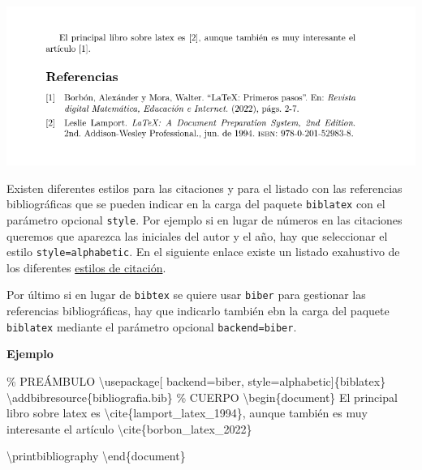 \documentclass[
  a4paper,
]{scrreport}
\newenvironment{Shaded}{\begin{snugshade}}{\end{snugshade}}
\newcommand{\BuiltInTok}[1]{\textcolor[rgb]{0.00,0.23,0.31}{#1}}
\newcommand{\CommentTok}[1]{\textcolor[rgb]{0.37,0.37,0.37}{#1}}
\newcommand{\ExtensionTok}[1]{\textcolor[rgb]{0.00,0.23,0.31}{#1}}
\newcommand{\FunctionTok}[1]{\textcolor[rgb]{0.28,0.35,0.67}{#1}}
\newcommand{\KeywordTok}[1]{\textcolor[rgb]{0.00,0.23,0.31}{#1}}
\newcommand{\NormalTok}[1]{\textcolor[rgb]{0.00,0.23,0.31}{#1}}
\begin{document}
\begin{tcolorbox}[enhanced jigsaw, bottomrule=.15mm, leftrule=.75mm, opacityback=0, titlerule=0mm, bottomtitle=1mm, colbacktitle=quarto-callout-note-color!10!white, arc=.35mm, toprule=.15mm, colframe=quarto-callout-note-color-frame, title={Salida}, coltitle=black, colback=white, breakable, toptitle=1mm, rightrule=.15mm, left=2mm, opacitybacktitle=0.6]

\includegraphics{./img/bibliografia/bibliografia.png}

\end{tcolorbox}

Existen diferentes estilos para las citaciones y para el listado con las
referencias bibliográficas que se pueden indicar en la carga del paquete
\texttt{biblatex} con el parámetro opcional \texttt{style}. Por ejemplo
si en lugar de números en las citaciones queremos que aparezca las
iniciales del autor y el año, hay que seleccionar el estilo
\texttt{style=alphabetic}. En el siguiente enlace existe un listado
exahustivo de los diferentes
\href{https://www.overleaf.com/learn/latex/Biblatex_citation_styles}{estilos
de citación}.

Por último si en lugar de \texttt{bibtex} se quiere usar \texttt{biber}
para gestionar las referencias bibliográficas, hay que indicarlo también
ebn la carga del paquete \texttt{biblatex} mediante el parámetro
opcional \texttt{backend=biber}.

\textbf{Ejemplo}

\begin{Shaded}
\begin{Highlighting}[]
\CommentTok{\% PREÁMBULO}
\BuiltInTok{\textbackslash{}usepackage}\NormalTok{[}
\NormalTok{backend=biber, style=alphabetic]\{}\ExtensionTok{biblatex}\NormalTok{\}}
\FunctionTok{\textbackslash{}addbibresource}\NormalTok{\{bibliografia.bib\}}
\CommentTok{\% CUERPO}
\KeywordTok{\textbackslash{}begin}\NormalTok{\{}\ExtensionTok{document}\NormalTok{\}}
\NormalTok{El principal libro sobre latex es }\KeywordTok{\textbackslash{}cite}\NormalTok{\{}\ExtensionTok{lamport\_latex\_1994}\NormalTok{\}, aunque también }
\NormalTok{es muy interesante el artículo }\KeywordTok{\textbackslash{}cite}\NormalTok{\{}\ExtensionTok{borbon\_latex\_2022}\NormalTok{\}}

\FunctionTok{\textbackslash{}printbibliography}
\KeywordTok{\textbackslash{}end}\NormalTok{\{}\ExtensionTok{document}\NormalTok{\}}
\end{Highlighting}
\end{Shaded}
\end{document}
